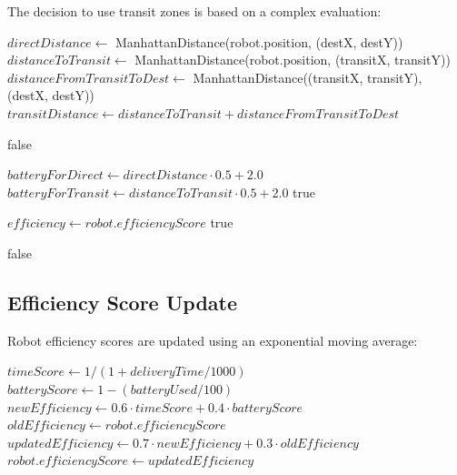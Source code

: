 \documentclass[12pt,a4paper]{article}
\begin{document}
The decision to use transit zones is based on a complex evaluation:

\begin{algorithm}
\caption{Transit Zone Decision}
\begin{algorithmic}[1]
    \State $directDistance \gets$ ManhattanDistance(robot.position, (destX, destY))
    \State $distanceToTransit \gets$ ManhattanDistance(robot.position, (transitX, transitY))
    \State $distanceFromTransitToDest \gets$ ManhattanDistance((transitX, transitY), (destX, destY))
    \State $transitDistance \gets distanceToTransit + distanceFromTransitToDest$
    
        \State \Return false
    \EndIf
    
    \State $batteryForDirect \gets directDistance \cdot 0.5 + 2.0$
        \State $batteryForTransit \gets distanceToTransit \cdot 0.5 + 2.0$
            \State \Return true
        \EndIf
    \EndIf
    
    \State $efficiency \gets robot.efficiencyScore$
        \State \Return true
    \EndIf
    
    \State \Return false
\EndFunction
\end{algorithmic}
\end{algorithm}

\subsection{Efficiency Score Update}

Robot efficiency scores are updated using an exponential moving average:

\begin{algorithm}
\caption{Efficiency Score Update}
\begin{algorithmic}[1]
    \State $timeScore \gets 1 / (1 + deliveryTime / 1000)$
    \State $batteryScore \gets 1 - (batteryUsed / 100)$
    \State $newEfficiency \gets 0.6 \cdot timeScore + 0.4 \cdot batteryScore$
    \State $oldEfficiency \gets robot.efficiencyScore$
    \State $updatedEfficiency \gets 0.7 \cdot newEfficiency + 0.3 \cdot oldEfficiency$
    \State $robot.efficiencyScore \gets updatedEfficiency$
\EndFunction
\end{algorithmic}
\end{algorithm}
\end{document}
